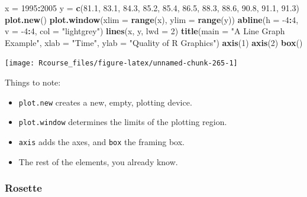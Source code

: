\documentclass[]{book}
\newenvironment{Shaded}{\begin{snugshade}}{\end{snugshade}}
\newcommand{\DataTypeTok}[1]{\textcolor[rgb]{0.13,0.29,0.53}{#1}}
\newcommand{\DecValTok}[1]{\textcolor[rgb]{0.00,0.00,0.81}{#1}}
\newcommand{\FloatTok}[1]{\textcolor[rgb]{0.00,0.00,0.81}{#1}}
\newcommand{\KeywordTok}[1]{\textcolor[rgb]{0.13,0.29,0.53}{\textbf{#1}}}
\newcommand{\NormalTok}[1]{#1}
\newcommand{\OperatorTok}[1]{\textcolor[rgb]{0.81,0.36,0.00}{\textbf{#1}}}
\newcommand{\StringTok}[1]{\textcolor[rgb]{0.31,0.60,0.02}{#1}}
\providecommand{\tightlist}{%
  \setlength{\itemsep}{0pt}\setlength{\parskip}{0pt}}
\theoremstyle{definition}
\theoremstyle{definition}
\theoremstyle{definition}
\theoremstyle{remark}
\begin{document}
\begin{Shaded}
\begin{Highlighting}[]
\NormalTok{x =}\StringTok{ }\DecValTok{1995}\OperatorTok{:}\DecValTok{2005}
\NormalTok{y =}\StringTok{ }\KeywordTok{c}\NormalTok{(}\FloatTok{81.1}\NormalTok{, }\FloatTok{83.1}\NormalTok{, }\FloatTok{84.3}\NormalTok{, }\FloatTok{85.2}\NormalTok{, }\FloatTok{85.4}\NormalTok{, }\FloatTok{86.5}\NormalTok{, }\FloatTok{88.3}\NormalTok{, }\FloatTok{88.6}\NormalTok{, }\FloatTok{90.8}\NormalTok{, }\FloatTok{91.1}\NormalTok{, }\FloatTok{91.3}\NormalTok{)}
\KeywordTok{plot.new}\NormalTok{()}
\KeywordTok{plot.window}\NormalTok{(}\DataTypeTok{xlim =} \KeywordTok{range}\NormalTok{(x), }\DataTypeTok{ylim =} \KeywordTok{range}\NormalTok{(y))}
\KeywordTok{abline}\NormalTok{(}\DataTypeTok{h =} \DecValTok{-4}\OperatorTok{:}\DecValTok{4}\NormalTok{, }\DataTypeTok{v =} \DecValTok{-4}\OperatorTok{:}\DecValTok{4}\NormalTok{, }\DataTypeTok{col =} \StringTok{"lightgrey"}\NormalTok{)}
\KeywordTok{lines}\NormalTok{(x, y, }\DataTypeTok{lwd =} \DecValTok{2}\NormalTok{)}
\KeywordTok{title}\NormalTok{(}\DataTypeTok{main =} \StringTok{"A Line Graph Example"}\NormalTok{,}
        \DataTypeTok{xlab =} \StringTok{"Time"}\NormalTok{,}
        \DataTypeTok{ylab =} \StringTok{"Quality of R Graphics"}\NormalTok{)}
\KeywordTok{axis}\NormalTok{(}\DecValTok{1}\NormalTok{)}
\KeywordTok{axis}\NormalTok{(}\DecValTok{2}\NormalTok{)}
\KeywordTok{box}\NormalTok{()}
\end{Highlighting}
\end{Shaded}

\texttt{[image: Rcourse\_files/figure-latex/unnamed-chunk-265-1]}

Things to note:

\begin{itemize}
\tightlist
\item
  \texttt{plot.new} creates a new, empty, plotting device.
\item
  \texttt{plot.window} determines the limits of the plotting region.
\item
  \texttt{axis} adds the axes, and \texttt{box} the framing box.
\item
  The rest of the elements, you already know.
\end{itemize}

\hypertarget{rosette}{%
\subsubsection{Rosette}\label{rosette}}
\end{document}
